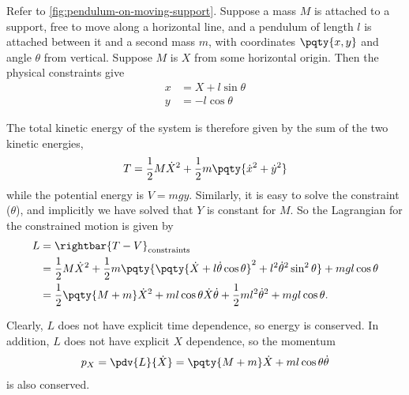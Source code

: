 \begin{example}
    Refer to \autoref{fig:pendulum-on-moving-support}. Suppose a mass \(M\) is attached to a support, free to move along a horizontal line, and a pendulum of length \(l\) is attached between it and a second mass \(m\), with coordinates \(\pqty{x, y}\) and angle \(\theta\) from vertical. Suppose \(M\) is \(X\) from some horizontal origin. Then the physical constraints give
    \begin{subequations}
        \begin{align}
            x &= X + l \sin \theta \\
            y &= - l \cos \theta
        \end{align}
    \end{subequations}

    The total kinetic energy of the system is therefore given by the sum of the two kinetic energies,
    \begin{equation}
        T = \frac{1}{2} M \dot{X}^2 + \frac{1}{2} m \pqty{\dot{x}^2 + \dot{y}^2}
    \end{equation}
    while the potential energy is \(V = mgy\). Similarly, it is easy to solve the constraint (\(\theta\)), and implicitly we have solved that \(Y\) is constant for \(M\). So the Lagrangian for the constrained motion is given by
    \begin{subequations}
        \begin{align}
            L &= \rightbar{T - V}_{\text{constraints}} \\
            &= \frac{1}{2} M \dot{X}^2 + \frac{1}{2} m \pqty{\pqty{\dot{X} + l \dot{\theta} \cos \theta}^2 + l^2 \dot{\theta}^2 \sin^2 \theta} + m g l \cos \theta \\
            &= \frac{1}{2} \pqty{M + m} \dot{X}^2 + m l \cos \theta \dot{X} \dot{\theta} + \frac{1}{2} m l^2 \dot{\theta}^2 + m g l \cos \theta.
        \end{align}
    \end{subequations}
    

    Clearly, \(L\) does not have explicit time dependence, so energy is conserved. In addition, \(L\) does not have explicit \(X\) dependence, so the momentum
    \begin{equation}
        p_X = \pdv{L}{\dot{X}} = \pqty{M + m} \dot{X} + m l \cos \theta \dot{\theta}
    \end{equation}
    is also conserved.


\end{example}
